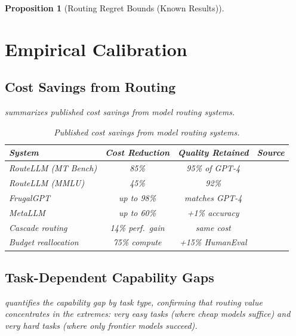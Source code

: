 \documentclass[11pt, a4paper, copyright]{googledeepmind}
\newtheorem{proposition}{Proposition}[section]
\begin{document}
\begin{proposition}[Routing Regret Bounds (Known Results)]
\section{Empirical Calibration}
\label{sec:calibration}

\subsection{Cost Savings from Routing}

 summarizes published cost savings from model routing systems.

\begin{table}[htbp]
\centering
\caption{Published cost savings from model routing systems.}
\label{tab:routingsavings}
\begin{tabular}{lccl}
\toprule
\textbf{System} & \textbf{Cost Reduction} & \textbf{Quality Retained} & \textbf{Source} \\
\midrule
RouteLLM (MT Bench) & 85\% & 95\% of GPT-4 & \citet{routellm2025} \\
RouteLLM (MMLU) & 45\% & 92\% & \citet{routellm2025} \\
FrugalGPT & up to 98\% & matches GPT-4 & \citet{frugalgpt2023} \\
MetaLLM & up to 60\% & +1\% accuracy & \citet{metallm2024} \\
Cascade routing & 14\% perf.\ gain & same cost & \citet{dekoninck2025cascade} \\
Budget reallocation & 75\% compute & +15\% HumanEval & \citet{hassid2024budget} \\
\bottomrule
\end{tabular}
\end{table}

\subsection{Task-Dependent Capability Gaps}

 quantifies the capability gap by task type, confirming that routing value concentrates in the extremes: very easy tasks (where cheap models suffice) and very hard tasks (where only frontier models succeed).


\end{proposition}
\end{document}
